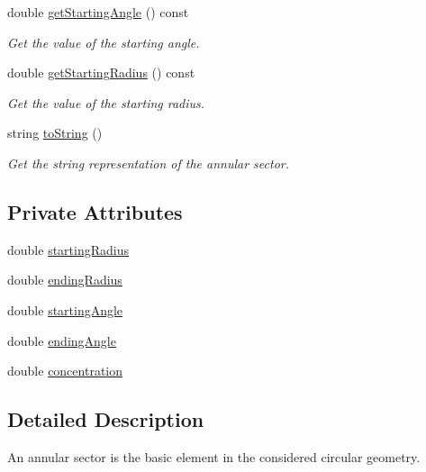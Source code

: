 \begin{DoxyCompactItemize}
double \hyperlink{classmultiscale_1_1video_1_1AnnularSector_a85931ba16351fffc33b5a8fc714cb4b8}{get\-Starting\-Angle} () const 
\begin{DoxyCompactList}\small\item\em Get the value of the starting angle. \end{DoxyCompactList}\item 
double \hyperlink{classmultiscale_1_1video_1_1AnnularSector_aef4f23e921eae6438889f0f1537bb3ef}{get\-Starting\-Radius} () const 
\begin{DoxyCompactList}\small\item\em Get the value of the starting radius. \end{DoxyCompactList}\item 
string \hyperlink{classmultiscale_1_1video_1_1AnnularSector_ab277036c93f9dcabc08e13ca49c78e53}{to\-String} ()
\begin{DoxyCompactList}\small\item\em Get the string representation of the annular sector. \end{DoxyCompactList}\end{DoxyCompactItemize}
\subsection*{Private Attributes}
\begin{DoxyCompactItemize}
\item 
double \hyperlink{classmultiscale_1_1video_1_1AnnularSector_a4c0094d8993edb40b15580fa58a8a393}{starting\-Radius}
\item 
double \hyperlink{classmultiscale_1_1video_1_1AnnularSector_aa45c5399240707d0b3fc02ee86b97c79}{ending\-Radius}
\item 
double \hyperlink{classmultiscale_1_1video_1_1AnnularSector_a437d3dc1b2fadace28bdc3d26a78c0b3}{starting\-Angle}
\item 
double \hyperlink{classmultiscale_1_1video_1_1AnnularSector_a0aebd11072dbefe42196d6bda2e4318d}{ending\-Angle}
\item 
double \hyperlink{classmultiscale_1_1video_1_1AnnularSector_a7f6a1e7618c9e2a10e35efb5740395b1}{concentration}
\end{DoxyCompactItemize}


\subsection{Detailed Description}
An annular sector is the basic element in the considered circular geometry. 

